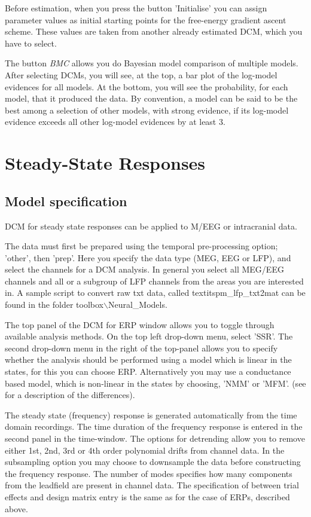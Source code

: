 Before estimation, when you press the button 'Initialise' you can
assign parameter values as initial starting points for the free-energy
gradient ascent scheme. These values are taken from another already
estimated DCM, which you have to select.

The button \textit{BMC} allows you do Bayesian model comparison of
multiple models. After selecting DCMs, you will see, at the top, a
bar plot of the log-model evidences for all models. At the bottom, you
will see the probability, for each model, that it produced the
data. By convention, a model can be said to be the best among a
selection of other models, with strong evidence, if its log-model
evidence exceeds all other log-model evidences by at least 3.

\section{Steady-State Responses}

\subsection{Model specification}
DCM for steady state responses can be applied to M/EEG or intracranial data.

The data must first be prepared using the temporal pre-processing option; 'other', then 'prep'. Here you specify the data type (MEG, EEG or LFP), and select the channels for a DCM analysis. In general you select all MEG/EEG channels and all or a subgroup of LFP channels from the areas you are interested in. A sample script to convert raw txt data, called textit{spm\_lfp\_txt2mat} can be found in the folder toolbox$\backslash$Neural\_Models.

The top panel of the DCM for ERP window allows you to toggle through available analysis methods. On the top left drop-down menu, select 'SSR'. The second drop-down menu in the right of the top-panel allows you to specify whether the analysis should be performed using a model which is linear in the states, for this you can choose ERP. Alternatively you may use a conductance based model, which is non-linear in the states by choosing, 'NMM' or 'MFM'. (see \cite{andre_sigmoid} for a description of the differences).

The steady state (frequency) response is generated automatically from the time domain recordings. The time duration of the frequency response is entered in the second panel in the time-window.  The options for detrending allow you to remove either 1st, 2nd, 3rd or 4th order polynomial drifts from channel data. In the subsampling option you may choose to downsample the data before constructing the frequency response. The number of modes specifies how many components from the leadfield are present in channel data. The specification of between trial effects and design matrix entry is the same as for the case of ERPs, described above.

